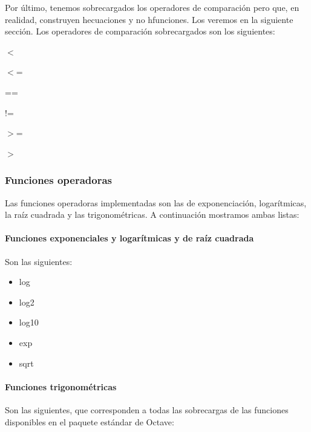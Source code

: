 \documentclass{article}
\begin{document}
Por último, tenemos sobrecargados los operadores de comparación pero
que, en realidad, construyen hecuaciones y no hfunciones. Los veremos
en la siguiente sección. Los operadores de comparación sobrecargados
son los siguientes:

\begin{multicols}{6}
  \begin{description}[font=\normalfont\ttfamily]
  \item[lt] $<$
  \item[le] $<$=
  \item[eq] ==
  \item[ne] !=
  \item[ge] $>$=
  \item[gt] $>$
  \end{description}
\end{multicols}

\subsubsection{Funciones operadoras}
\label{sssec:funops}
Las funciones operadoras implementadas son las de exponenciación,
logarítmicas, la raíz cuadrada y las trigonométricas. A continuación
mostramos ambas listas:

\paragraph{Funciones exponenciales y logarítmicas y de raíz cuadrada}
Son las siguientes:

\begin{multicols}{5}
  \begin{itemize}[font=\normalfont\ttfamily]
  \item log
  \item log2
  \item log10
  \item exp
  \item sqrt
  \end{itemize}
\end{multicols}

\paragraph{Funciones trigonométricas}
Son las siguientes, que corresponden a todas las sobrecargas de las
funciones disponibles en el paquete estándar de Octave:
\end{document}
